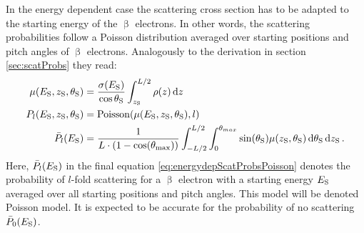 In the energy dependent case the scattering cross section has to be adapted to the starting energy of the $\upbeta$ electrons. In other words, the scattering probabilities follow a Poisson distribution averaged over starting positions and pitch angles of $\upbeta$ electrons. Analogously to the derivation in section \ref{sec:scatProbs} they read:
\begin{subequations}
\label{eq:energydepScatProbsPoissonModel}
\begin{align}
    \mu(E_\mathrm{S},z_\mathrm{S},\theta_\mathrm{S}) &=
    \frac{\sigma(E_\mathrm{S})}{\cos\theta_\mathrm{S}}
    \int_{z_\mathrm{S}}^{L/2} \rho(z)\mathop{}\!\mathrm{d} z \label{eq:energydepScatProbsPoissonExpectedScatCount} \\
    P_l(E_\mathrm{S},z_\mathrm{S},\theta_\mathrm{S}) &=
    \mathrm{Poisson}(\mu(E_\mathrm{S},z_\mathrm{S},\theta_\mathrm{S}),l) \label{eq:nonAveragedEnergydepScatProbsPoisson} \\
    \bar{P}_l(E_\mathrm{S}) &=
    \frac{1}{L \cdot (1-\cos(\theta_\mathrm{max}))} 
      \int_{-L/2}^{L/2}  
          \int_{0}^{\theta_{max}} 
            \sin(\theta_\mathrm{S})
            \mu(z_\mathrm{S},\theta_\mathrm{S})
          \mathop{}\!\mathrm{d}\theta_\mathrm{S}
      \mathop{}\!\mathrm{d}z_\mathrm{S}
      \label{eq:energydepScatProbsPoisson}
    \text{\,.}
\end{align}
\end{subequations}
Here, $\bar{P}_l(E_\mathrm{S})$ in the final equation \eqref{eq:energydepScatProbsPoisson} denotes the probability of $l$-fold scattering for a $\upbeta$ electron with a starting energy $E_\mathrm{S}$ averaged over all starting positions and pitch angles. This model will be denoted Poisson model. It is expected to be accurate for the probability of no scattering $\bar{P}_0(E_\mathrm{S})$.

